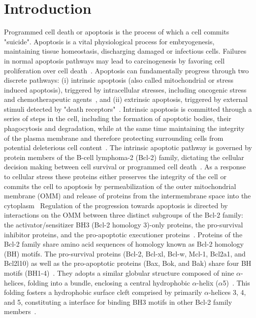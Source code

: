\documentclass[10pt,letterpaper]{article}
\begin{document}
\section*{Introduction}
Programmed cell death or apoptosis is the process of which a cell commits "suicide". Apoptosis is a vital physiological process for embryogenesis, maintaining tissue homeostasis, discharging damaged or infectious cells. Failures in normal apoptosis pathways may lead to carcinogenesis by favoring cell proliferation over cell death~\cite{Reed1999, Kroemer2009}. Apoptosis can fundamentally progress through two discrete pathways: (i) intrinsic apoptosis (also called mitochondrial or stress induced apoptosis), triggered by intracellular stresses, including oncogenic stress and chemotherapeutic agents~\cite{Villunger2003}, and (ii) extrinsic apoptosis, triggered by external stimuli detected by "death receptors"~\cite{Strasser2009}.
Intrinsic apoptosis is committed through a series of steps in the cell, including the formation of apoptotic bodies, their phagocytosis and degradation, while at the same time maintaining the integrity of the plasma membrane and therefore protecting surrounding cells from potential deleterious cell content~\cite{Kerr1972, Nagata2010}. The intrinsic apoptotic pathway is governed by protein members of the B-cell lymphoma-2 (Bcl-2) family, dictating the cellular decision making between cell survival or programmed cell death~\cite{Edlich2017}. As a response to cellular stress these proteins either preserves the integrity of the cell or commits the cell to apoptosis by permeabilization of the outer mitochondrial membrane (OMM) and release of proteins from the intermembrane space into the cytoplasm~\cite{Heimlich2004, Zheng2016}
Regulation of the progression towards apoptosis is directed by interactions on the OMM between three distinct subgroups of the Bcl-2 family: the activator/sensitizer BH3 (Bcl-2 homology 3)-only proteins, the pro-survival inhibitor proteins, and the pro-apoptotic executioner proteins~\cite{Czabotar2014, Um2015}. Proteins of the Bcl-2 family share amino acid sequences of homology known as Bcl-2 homology (BH) motifs. The pro-survival proteins (Bcl-2, Bcl-xl, Bcl-w, Mcl-1, Bcl2a1, and Bcl2l10) as well as the pro-apoptotic proteins (Bax, Bok, and Bak) share four BH motifs (BH1-4)~\cite{Kvansakul2008}. They adopts a similar globular structure composed of nine $\alpha$-helices, folding into a bundle, enclosing a central hydrophobic $\alpha$-helix ($\alpha$5)~\cite{Muchmore1996}. This folding fosters a hydrophobic surface cleft comprised by primarily $\alpha$-helices 3, 4, and 5, constituting a interface for binding BH3 motifs in other Bcl-2 family members~\cite{Czabotar2014}.
\end{document}
